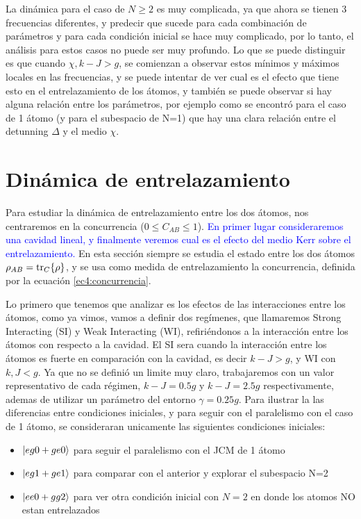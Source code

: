 La dinámica para el caso de $N\geq2$ es muy complicada, ya que ahora se tienen 3 frecuencias diferentes, y predecir que sucede para cada combinación de parámetros y para cada condición inicial se hace muy complicado, por lo tanto, el análisis para estos casos no puede ser muy profundo. Lo que se puede distinguir es que cuando $\chi,k-J>g$, se comienzan a observar estos mínimos y máximos locales en las frecuencias, y se puede intentar de ver cual es el efecto que tiene esto en el entrelazamiento de los átomos, y también se puede observar si hay alguna relación entre los parámetros, por ejemplo como se encontró para el caso de 1 átomo (y para el subespacio de N=1) que hay una clara relación entre el detunning $\Delta$ y el medio $\chi$.

\section{Dinámica de entrelazamiento}
Para estudiar la dinámica de entrelazamiento entre los dos átomos, nos centraremos en la concurrencia ($0\leq C_{AB} \leq 1$).
\textcolor{blue}{En primer lugar consideraremos una cavidad lineal, y finalmente veremos cual es el efecto del medio Kerr sobre el entrelazamiento.}
En esta sección siempre se estudia el estado entre los dos átomos $\rho_{AB}=\tr_C\{\rho\}$, y se usa como medida de entrelazamiento la concurrencia, definida por la ecuación \ref{ec4:concurrencia}.

Lo primero que tenemos que analizar es los efectos de las interacciones entre los átomos, como ya vimos,  vamos a definir dos regímenes, que llamaremos Strong Interacting (SI) y Weak Interacting (WI), refiriéndonos a la interacción entre los átomos con respecto a la cavidad. El SI sera cuando la interacción entre los átomos es fuerte en comparación con la cavidad, es decir $k-J>g$, y WI con $k,J<g$. Ya que no se definió un limite muy claro, trabajaremos con un valor representativo de cada régimen, $k-J=0.5g$ y $k-J=2.5g$ respectivamente, ademas de utilizar un parámetro del entorno $\gamma=0.25g$. Para ilustrar la las diferencias entre condiciones iniciales, y para seguir con el paralelismo con el caso de 1 átomo, se consideraran unicamente las siguientes condiciones iniciales:
\begin{itemize}
    \item $\ket{eg0+ge0}$ para seguir el paralelismo con el JCM de 1 átomo 
    \item $\ket{eg1+ge1}$ para comparar con el anterior y explorar el subespacio N=2
    \item $\ket{ee0+gg2}$ para ver otra condición inicial con $N=2$ en donde los atomos NO estan entrelazados
\end{itemize}

